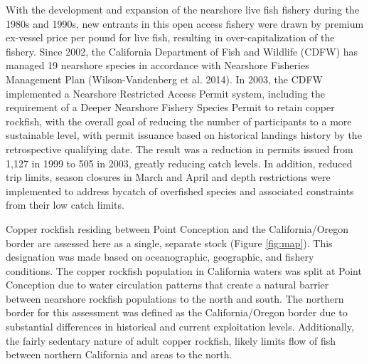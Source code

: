 \documentclass[11pt,
  english,
  a4paper,
]{article}
\begin{document}
\leavevmode\tagmcend\tagstructend\par


With the development and expansion of the nearshore live fish fishery during the 1980s and 1990s, new entrants in this open access fishery were drawn by premium ex-vessel price per pound for live fish, resulting in over-capitalization of the fishery. Since 2002, the California Department of Fish and Wildlife (CDFW) has managed 19 nearshore species in accordance with Nearshore Fisheries Management Plan {(Wilson-Vandenberg et al. 2014)\leavevmode\tagmcend\tagstructend}. In 2003, the CDFW implemented a Nearshore Restricted Access Permit system, including the requirement of a Deeper Nearshore Fishery Species Permit to retain copper rockfish, with the overall goal of reducing the number of participants to a more sustainable level, with permit issuance based on historical landings history by the retrospective qualifying date. The result was a reduction in permits issued from 1,127 in 1999 to 505 in 2003, greatly reducing catch levels. In addition, reduced trip limits, season closures in March and April and depth restrictions were implemented to address bycatch of overfished species and associated constraints from their low catch limits.

\leavevmode\tagmcend\tagstructend\par


Copper rockfish residing between Point Conception and the California/Oregon border are assessed here as a single, separate stock (Figure \ref{fig:map}). This designation was made based on oceanographic, geographic, and fishery conditions. The copper rockfish population in California waters was split at Point Conception due to water circulation patterns that create a natural barrier between nearshore rockfish populations to the north and south. The northern border for this assessment was defined as the California/Oregon border due to substantial differences in historical and current exploitation levels. Additionally, the fairly sedentary nature of adult copper rockfish, likely limits flow of fish between northern California and areas to the north.

\leavevmode\tagmcend\tagstructend\par

\end{document}
